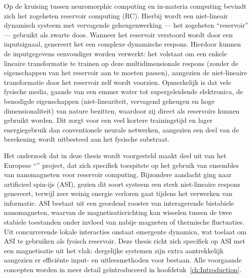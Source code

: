 Op de kruising tussen neuromorphic computing en in-materia computing bevindt zich het zogeheten reservoir computing (RC).
Hierbij wordt een niet-lineair dynamisch systeem met vervagende geheugenwerking --- het zogeheten ``reservoir'' --- gebruikt als zwarte doos.
Wanneer het reservoir verstoord wordt door een inputsignaal, genereert het een complexe dynamische respons.
Hierdoor kunnen de inputgegevens eenvoudiger worden verwerkt: het volstaat om een enkele lineaire transformatie te trainen op deze multidimensionale respons (zonder de eigenschappen van het reservoir aan te moeten passen), aangezien de niet-lineaire transformatie door het reservoir zelf wordt voorzien. 
Opmerkelijk is dat vele fysische media, gaande van een emmer water tot supergeleidende elektronica, de benodigde eigenschappen (niet-lineariteit, vervagend geheugen en hoge dimensionaliteit) van nature bezitten, waardoor zij direct als reservoirs kunnen gebruikt worden.
Dit zorgt voor een veel kortere trainingstijd en lager energiegebruik dan conventionele neurale netwerken, aangezien een deel van de berekening wordt uitbesteed aan het fysische substraat. \par
Het onderzoek dat in deze thesis wordt voorgesteld maakt deel uit van het Europese ``\spinengine'' project, dat zich specifiek toespitste op het gebruik van ensembles van nanomagneten voor reservoir computing.
Bijzondere aandacht ging naar artificieel spin-ijs (ASI), gezien dit soort systeem een sterk niet-lineaire respons genereert, terwijl zeer weinig energie verloren gaat tijdens het verwerken van informatie.
ASI bestaat uit een geordend rooster van interagerende bistabiele nanomagneten, waarvan de magnetisatierichting kan wisselen tussen de twee stabiele toestanden onder invloed van nabije magneten of thermische fluctuaties.
Uit concurrerende lokale interacties onstaat emergente dynamica, wat toelaat om ASI te gebruiken als fysisch reservoir.
Deze thesis richt zich specifiek op ASI met een magnetisatie uit het vlak: dergelijke systemen zijn extra aantrekkelijk aangezien er effici\"ente input- en uitleesmethoden voor bestaan.
Alle voorgaande concepten worden in meer detail ge\"introduceerd in hoofdstuk~\ref{ch:Introduction}. \\

